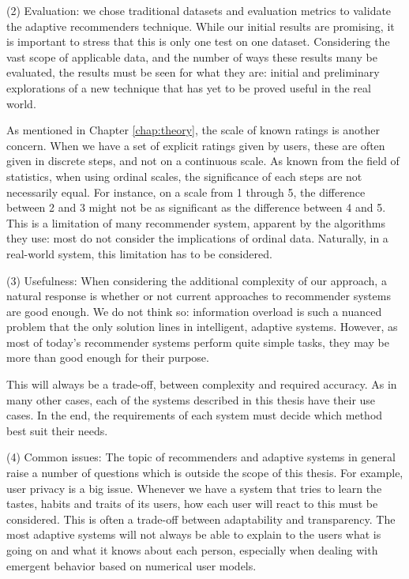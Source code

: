 (2) Evaluation: we chose traditional datasets and evaluation metrics
to validate the adaptive recommenders technique.
While our initial results are promising, it is important to stress
that this is only one test on one dataset. Considering the vast scope
of applicable data, and the number of ways these results many be 
evaluated, the results must be seen for what they are:
initial and preliminary explorations of a new technique
that has yet to be proved useful in the real world.

As mentioned in Chapter \ref{chap:theory}, the scale of known ratings is another concern.
When we have a set of explicit ratings given by users, these are often
given in discrete steps, and not on a continuous scale.
As known from the field of statistics, when using ordinal scales,
the significance of each steps are not necessarily equal.
For instance, on a scale from 1 through 5, the difference
between 2 and 3 might not be as significant as the difference between 4 and 5.
This is a limitation of many recommender system, apparent by the algorithms they use:
most do not consider the implications of ordinal data.
Naturally, in a real-world system, this limitation has to be considered.

(3) Usefulness:
When considering the additional complexity of our approach,
a natural response is whether or not current approaches
to recommender systems are good enough.
We do not think so: information overload is such a nuanced problem 
that the only solution lines in intelligent, adaptive systems.
However, as most of today's recommender systems 
perform quite simple tasks, they may be more
than good enough for their purpose.

This will always be a trade-off, between complexity and required accuracy.
As in many other cases, each of the systems described in this thesis
have their use cases. In the end, the requirements of each system
must decide which method best suit their needs.

(4) Common issues:
The topic of recommenders and adaptive systems in general
raise a number of questions which is outside the scope of this thesis.
For example, user privacy is a big issue.
Whenever we have a system that tries to learn the tastes, habits and
traits of its users, how each user will react to this must be considered.
This is often a trade-off between adaptability and transparency.
The most adaptive systems will not always be able to explain to the users
what is going on and what it knows about each person,
especially when dealing with emergent behavior based on 
numerical user models.

